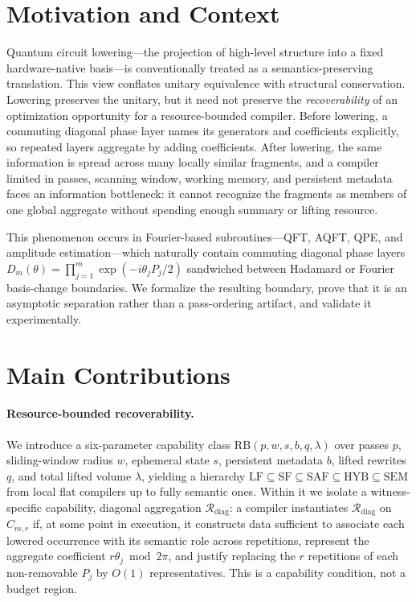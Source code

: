 \documentclass[a4paper]{article}
\begin{document}

\section{Motivation and Context}

Quantum circuit lowering---the projection of high-level structure into a fixed hardware-native
basis---is conventionally treated as a semantics-preserving translation. This view conflates unitary
equivalence with structural conservation. Lowering preserves the unitary, but it need not preserve
the \emph{recoverability} of an optimization opportunity for a resource-bounded compiler. Before
lowering, a commuting diagonal phase layer names its generators and coefficients explicitly, so
repeated layers aggregate by adding coefficients. After lowering, the same information is spread
across many locally similar fragments, and a compiler limited in passes, scanning window, working
memory, and persistent metadata faces an information bottleneck: it cannot recognize the fragments
as members of one global aggregate without spending enough summary or lifting resource.

This phenomenon occurs in Fourier-based subroutines---QFT, AQFT, QPE, and amplitude estimation---which
naturally contain commuting diagonal phase layers
$D_m(\theta)=\prod_{j=1}^{m}\exp(-i\theta_jP_j/2)$ sandwiched between Hadamard or Fourier
basis-change boundaries. We formalize the resulting boundary, prove that it is an asymptotic
separation rather than a pass-ordering artifact, and validate it experimentally.

\section{Main Contributions}

\paragraph{Resource-bounded recoverability.}
We introduce a six-parameter capability class $\mathrm{RB}(p,w,s,b,q,\lambda)$ over passes $p$,
sliding-window radius $w$, ephemeral state $s$, persistent metadata $b$, lifted rewrites $q$, and
total lifted volume $\lambda$, yielding a hierarchy
$\mathrm{LF}\subseteq\mathrm{SF}\subseteq\mathrm{SAF}\subseteq\mathrm{HYB}\subseteq\mathrm{SEM}$ from
local flat compilers up to fully semantic ones. Within it we isolate a witness-specific capability,
diagonal aggregation $\mathcal{R}_{\mathrm{diag}}$: a compiler instantiates $\mathcal{R}_{\mathrm{diag}}$
on $C_{m,r}$ if, at some point in execution, it constructs data sufficient to associate each lowered
occurrence with its semantic role across repetitions, represent the aggregate coefficient
$r\theta_j\bmod 2\pi$, and justify replacing the $r$ repetitions of each non-removable $P_j$ by
$O(1)$ representatives. This is a capability condition, not a budget region.
\end{document}
